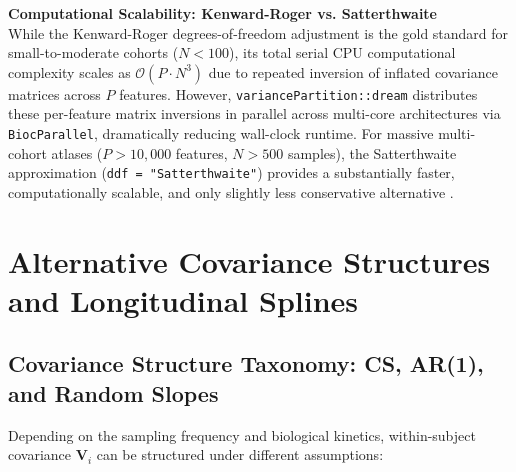 \documentclass[11pt,twoside,openright]{book}
\begin{document}
\begin{notebox}
\textbf{Computational Scalability: Kenward-Roger vs. Satterthwaite}\\
While the Kenward-Roger degrees-of-freedom adjustment is the gold standard for small-to-moderate cohorts ($N < 100$), its total serial CPU computational complexity scales as $\mathcal{O}(P \cdot N^3)$ due to repeated inversion of inflated covariance matrices across $P$ features. However, \texttt{variancePartition::dream} distributes these per-feature matrix inversions in parallel across multi-core architectures via \texttt{BiocParallel}, dramatically reducing wall-clock runtime. For massive multi-cohort atlases ($P > 10,000$ features, $N > 500$ samples), the Satterthwaite approximation (\texttt{ddf = "Satterthwaite"}) provides a substantially faster, computationally scalable, and only slightly less conservative alternative \cite{kuznetsova2017lmertest}.
\end{notebox}

\section{Alternative Covariance Structures and Longitudinal Splines}

\subsection{Covariance Structure Taxonomy: CS, AR(1), and Random Slopes}

Depending on the sampling frequency and biological kinetics, within-subject covariance $\mathbf{V}_i$ can be structured under different assumptions:
\end{document}
